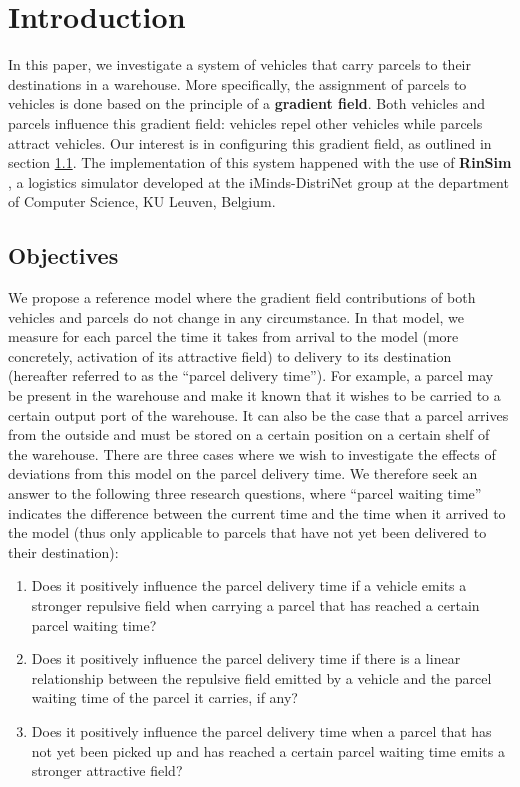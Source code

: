 \section{Introduction}\label{sec:intro}
In this paper, we investigate a system of vehicles that carry parcels to their destinations in a warehouse. More specifically, the assignment of parcels to vehicles is done based on the principle of a \textbf{gradient field}. Both vehicles and parcels influence this gradient field: vehicles repel other vehicles while parcels attract vehicles. Our interest is in configuring this gradient field, as outlined in section \ref{sec:objectives}. The implementation of this system happened with the use of \textbf{RinSim} \cite{rinsim}, a logistics simulator developed at the iMinds-DistriNet group at the department of Computer Science, KU Leuven, Belgium.

\subsection{Objectives}\label{sec:objectives}
We propose a reference model where the gradient field contributions of both vehicles and parcels do not change in any circumstance. In that model, we measure for each parcel the time it takes from arrival to the model (more concretely, activation of its attractive field) to delivery to its destination (hereafter referred to as the ``parcel delivery time''). For example, a parcel may be present in the warehouse and make it known that it wishes to be carried to a certain output port of the warehouse. It can also be the case that a parcel arrives from the outside and must be stored on a certain position on a certain shelf of the warehouse.
There are three cases where we wish to investigate the effects of deviations from this model on the parcel delivery time. We therefore seek an answer to the following three research questions, where ``parcel waiting time'' indicates the difference between the current time and the time when it arrived to the model (thus only applicable to parcels that have not yet been delivered to their destination):
\begin{enumerate}
\item Does it positively influence the parcel delivery time if a vehicle emits a stronger repulsive field when carrying a parcel that has reached a certain parcel waiting time?
\item Does it positively influence the parcel delivery time if there is a linear relationship between the repulsive field emitted by a vehicle and the parcel waiting time of the parcel it carries, if any?
\item Does it positively influence the parcel delivery time when a parcel that has not yet been picked up and has reached a certain parcel waiting time emits a stronger attractive field?
\end{enumerate}

